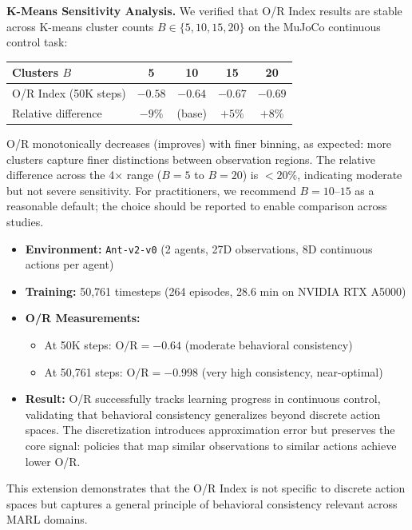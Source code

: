 \documentclass[twoside]{article}
\theoremstyle{remark}
\begin{document}
\textbf{K-Means Sensitivity Analysis.} We verified that O/R Index results are stable across K-means cluster counts $B \in \{5, 10, 15, 20\}$ on the MuJoCo continuous control task:
\begin{center}
\begin{tabular}{lcccc}
\toprule
\textbf{Clusters $B$} & 5 & 10 & 15 & 20 \\
\midrule
O/R Index (50K steps) & $-0.58$ & $-0.64$ & $-0.67$ & $-0.69$ \\
Relative difference & $-9\%$ & (base) & $+5\%$ & $+8\%$ \\
\bottomrule
\end{tabular}
\end{center}
O/R monotonically decreases (improves) with finer binning, as expected: more clusters capture finer distinctions between observation regions. The relative difference across the 4× range ($B=5$ to $B=20$) is $<20\%$, indicating moderate but not severe sensitivity. For practitioners, we recommend $B=10$--$15$ as a reasonable default; the choice should be reported to enable comparison across studies.

\begin{itemize}
    \item \textbf{Environment:} \texttt{Ant-v2-v0} (2 agents, 27D observations, 8D continuous actions per agent)
    \item \textbf{Training:} 50,761 timesteps (264 episodes, 28.6 min on NVIDIA RTX A5000)
    \item \textbf{O/R Measurements:}
    \begin{itemize}
        \item At 50K steps: $\text{O/R} = -0.64$ (moderate behavioral consistency)
        \item At 50,761 steps: $\text{O/R} = -0.998$ (very high consistency, near-optimal)
    \end{itemize}
    \item \textbf{Result:} O/R successfully tracks learning progress in continuous control, validating that behavioral consistency generalizes beyond discrete action spaces. The discretization introduces approximation error but preserves the core signal: policies that map similar observations to similar actions achieve lower O/R.
\end{itemize}

This extension demonstrates that the O/R Index is not specific to discrete action spaces but captures a general principle of behavioral consistency relevant across MARL domains.
\end{document}
